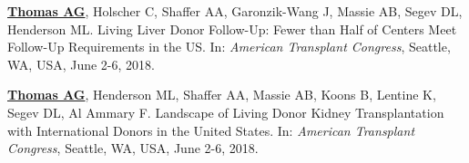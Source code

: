 \documentclass[10pt]{article}
\makeatletter
\newlength{\bibhang}
\newlength{\bibsep}
 {\@listi \global\bibsep\itemsep \global\advance\bibsep by\parsep}
\newenvironment{bibenum*}
  {\renewcommand\labelenumi{[\theenumi]}%
   \etaremune[
     topsep=0pt,
     itemsep=\bibsep,
     parsep=0pt,partopsep=0pt,
     itemindent=-\bibhang,
     leftmargin={\bibhang+\widthof{[999]}}]}
  {\endetaremune}
\makeatother
\begin{document}
\begin{bibenum*}
\item \underline{\textbf{Thomas AG}}, Holscher C, Shaffer AA,
  Garonzik-Wang J, Massie AB, Segev DL, Henderson ML.
  Living Liver Donor Follow-Up: Fewer than Half of
  Centers Meet Follow-Up Requirements in the US.
  In: \emph{American Transplant Congress},
  Seattle, WA, USA, June 2-6, 2018.

\item \underline{\textbf{Thomas AG}}, Henderson ML, Shaffer AA,
  Massie AB, Koons B, Lentine K, Segev DL, Al Ammary F.
  Landscape of Living Donor Kidney Transplantation with
  International Donors in the United States.
  In: \emph{American Transplant Congress},
  Seattle, WA, USA, June 2-6, 2018.







\end{bibenum*}
\end{document}
